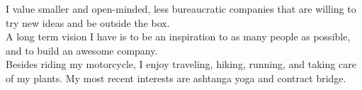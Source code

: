 \documentclass[9pt]{template} %
\begin{document}
\vspace{0.5cm}



\begin{minipage}[t]{0.4\textwidth} %
  \vspace{-\baselineskip} %
  I value smaller and open-minded, less bureaucratic companies that are willing to try new ideas and be outside the box.\\

  A long term vision I have is to be an inspiration to as many people as possible, and to build an awesome company.\\

  Besides riding my motorcycle, I enjoy traveling, hiking, running, and taking care of my plants. My most recent interests are ashtanga yoga and contract bridge.
\end{minipage}
\hfill %
\begin{minipage}[t]{0.5\textwidth} %
  \vspace{-\baselineskip} %
  \begin{barchart}{5.0}
  \end{barchart}
\end{minipage}



\end{document}
